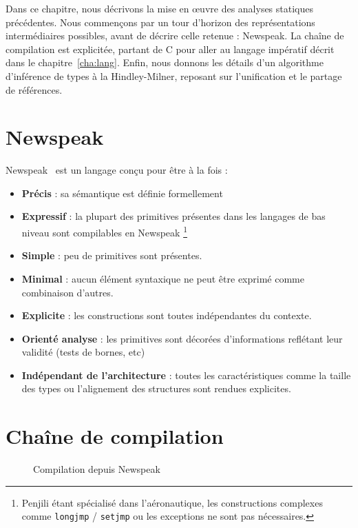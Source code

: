Dans ce chapitre, nous décrivons la mise en œuvre des analyses statiques
précédentes. Nous commençons par un tour d'horizon des représentations
intermédiaires possibles, avant de décrire celle retenue : Newspeak. La chaîne
de compilation est explicitée, partant de C pour aller au langage impératif
décrit dans le chapitre~\ref{cha:lang}. Enfin, nous donnons les détails d'un
algorithme d'inférence de types à la Hindley-Milner, reposant sur l'unification
et le partage de références.

%

\section{Newspeak}
\label{sec:npk}

Newspeak~\cite{newspeak} est un langage conçu pour être à la fois :

\begin{itemize}
  \item \textbf{Précis} : sa sémantique est définie formellement
  \cite{newspeak}
  \item \textbf{Expressif} : la plupart des primitives présentes dans les
    langages de bas niveau sont compilables en Newspeak \footnote{Penjili étant
    spécialisé dans l'aéronautique, les constructions complexes comme
    \texttt{longjmp} / \texttt{setjmp} ou les exceptions ne sont pas nécessaires.}
  \item \textbf{Simple} : peu de primitives sont présentes.
  \item \textbf{Minimal} : aucun élément syntaxique ne peut être exprimé
    comme combinaison d'autres.
  \item \textbf{Explicite} : les constructions sont toutes indépendantes du
    contexte.
  \item \textbf{Orienté analyse} : les primitives sont décorées d'informations
    reflétant leur validité (tests de bornes, etc)
  \item \textbf{Indépendant de l'architecture} : toutes les caractéristiques comme
    la taille des types ou l'alignement des structures sont rendues explicites.
\end{itemize}

\section{Chaîne de compilation}

\begin{figure}
  \centering
  
  \caption{Compilation depuis Newspeak}
  \label{fig:compil-npk}
\end{figure}


